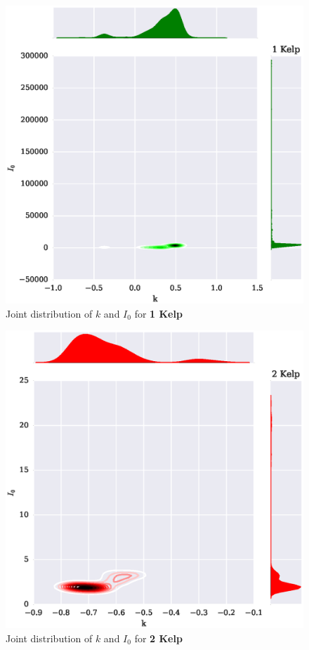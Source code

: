 \documentclass{article}
\begin{document}
\begin{figure}[H]
	\centering
	\includegraphics[width=\textwidth]{plots/joint_1_kelp.eps}
	\caption{Joint distribution of $k$ and $I_0$ for \textbf{1 Kelp}}
	\label{joint_1_kelp}
\end{figure}

\begin{figure}[H]
	\centering
	\includegraphics[width=\textwidth]{plots/joint_2_kelp.eps}
	\caption{Joint distribution of $k$ and $I_0$ for \textbf{2 Kelp}}
	\label{joint_2_kelp}
\end{figure}
\end{document}
